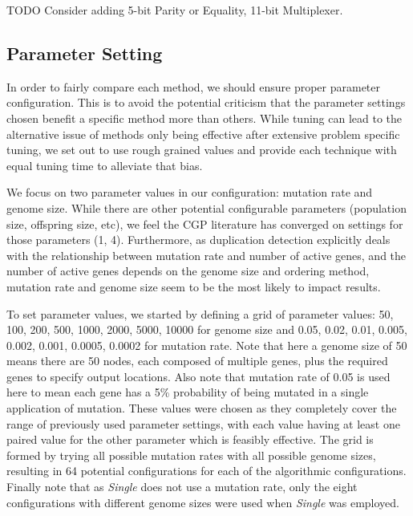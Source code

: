 \documentclass[journal]{IEEEtran}
\begin{document}
TODO Consider adding 5-bit Parity or Equality, 11-bit Multiplexer.

\subsection{Parameter Setting}
In order to fairly compare each method, we should ensure proper parameter configuration.
This is to avoid the potential criticism that the parameter settings chosen benefit
a specific method more than others.  While tuning can lead to the alternative issue
of methods only being effective after extensive problem specific tuning, we set out to use
rough grained values and provide each technique with equal tuning time to alleviate that bias.

We focus on two parameter values in our configuration: mutation rate and genome size.
While there are other potential configurable parameters (population size, offspring size, etc),
we feel the CGP literature has converged on settings for those parameters (1, 4).
Furthermore, as duplication detection explicitly deals with the relationship between
mutation rate and number of active genes, and the number of active genes depends
on the genome size and ordering method, mutation rate and genome size seem to be
the most likely to impact results.

To set parameter values, we started by defining a grid of parameter values:
50, 100, 200, 500, 1000, 2000, 5000, 10000 for genome size and 0.05, 0.02, 0.01,
0.005, 0.002, 0.001, 0.0005, 0.0002 for mutation rate.  Note that here a genome
size of 50 means there are 50 nodes, each composed of multiple genes, plus the
required genes to specify output locations.  Also note that mutation rate of 0.05
is used here to mean each gene has a 5\% probability of being mutated in a single
application of mutation.  These values were chosen as they completely cover the
range of previously used parameter settings, with each value having at least
one paired value for the other parameter which is feasibly effective.
The grid is formed by trying all possible mutation rates
with all possible genome sizes, resulting in 64 potential configurations for each
of the algorithmic configurations.  Finally note that as \emph{Single} does not
use a mutation rate, only the eight configurations with different genome sizes were
used when \emph{Single} was employed.
\end{document}
